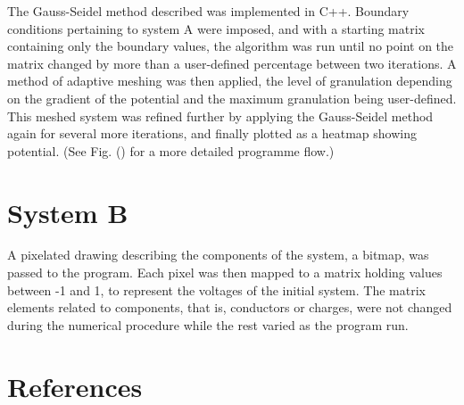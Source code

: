 \documentclass[a4paper]{jpconf}
\begin{document}

The Gauss-Seidel method described was implemented in C++. Boundary conditions pertaining to system A were imposed, and with a starting matrix containing only the boundary values, the algorithm was run until no point on the matrix changed by more than a user-defined percentage between two iterations. A method of adaptive meshing was then applied, the level of granulation depending on the gradient of the potential and the maximum granulation being user-defined. This meshed system was refined further by applying the Gauss-Seidel method again for several more iterations, and finally plotted as a heatmap showing potential. (See Fig. () for a more detailed programme flow.)


\section*{System B}

A pixelated drawing describing the components of the system, a bitmap, was passed to the program. Each pixel was then mapped to a matrix holding values between -1 and 1, to represent the voltages of the initial system. The matrix elements related to components, that is, conductors or charges, were not changed during the numerical procedure while the rest varied as the program run.


\section*{References}


\end{document}
